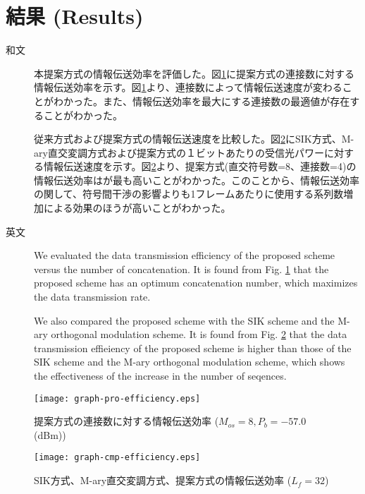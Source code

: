 ﻿\documentclass[a4j,10pt]{jarticle}
\begin{document}
\section{結果 (Results)}
\begin{description}
 \item[和文] 本提案方式の情報伝送効率を評価した。図\ref{fig:graph-proposal-efficiency}に提案方式の連接数に対する情報伝送効率を示す。図\ref{fig:graph-proposal-efficiency}より、連接数によって情報伝送速度が変わることがわかった。また、情報伝送効率を最大にする連接数の最適値が存在することがわかった。

従来方式および提案方式の情報伝送速度を比較した。図\ref{fig:graph-cmp-efficiency}にSIK方式、M-ary直交変調方式および提案方式の１ビットあたりの受信光パワーに対する情報伝送速度を示す。図\ref{fig:graph-cmp-efficiency}より、提案方式(直交符号数=8、連接数=4)の情報伝送効率はが最も高いことがわかった。このことから、情報伝送効率の関して、符号間干渉の影響よりも1フレームあたりに使用する系列数増加による効果のほうが高いことがわかった。
%
 \item[英文] We evaluated the data transmission efficiency of the proposed scheme versus the number of concatenation. It is found from Fig. \ref{fig:graph-proposal-efficiency} that the proposed scheme has an optimum concatenation number, which maximizes the data transmission rate. 

We also compared the proposed scheme with the SIK scheme and the M-ary orthogonal modulation scheme. It is found from Fig. \ref{fig:graph-cmp-efficiency} that the data transmission effieiency of the proposed scheme is higher than those of the SIK scheme and the M-ary orthogonal modulation scheme, which shows the effectiveness of the increase in the number of seqences. 
\end{description}
%
\begin{figure}[hpbt]
\begin{center}
  \texttt{[image: graph-pro-efficiency.eps]}
\caption{提案方式の連接数に対する情報伝送効率 
($M_{os} = 8, P_{b}=-57.0$ (dBm))}
\label{fig:graph-proposal-efficiency}
\end{center}
\end{figure}
%
\begin{figure}[hpbt]
\begin{center}
  \texttt{[image: graph-cmp-efficiency.eps]}
\caption{SIK方式、M-ary直交変調方式、提案方式の情報伝送効率
($L_{f} = 32$)}
\label{fig:graph-cmp-efficiency}
\end{center}
\end{figure}
%
\end{document}
